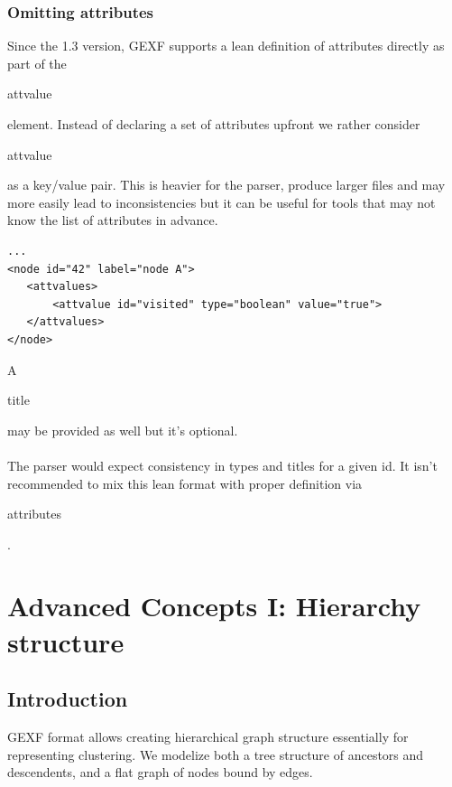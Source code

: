 \documentclass[a4paper,10pt]{article}
\begin{document}
\subsubsection{Omitting attributes}

Since the 1.3 version, GEXF supports a lean definition of attributes directly as part of the \begin{footnotesize}attvalue\end{footnotesize} element. Instead of declaring a set of attributes upfront we rather consider \begin{footnotesize}attvalue\end{footnotesize} as a key/value pair. This is heavier for the parser, produce larger files and may more easily lead to inconsistencies but it can be useful for tools that may not know the list of attributes in advance.

\lstset{ style=gexf }
\begin{lstlisting}[caption={Attribute definition in attvalue },label=attvalueidtype]
...
<node id="42" label="node A">
   <attvalues>
       <attvalue id="visited" type="boolean" value="true">
   </attvalues>
</node>
\end{lstlisting}

A \begin{footnotesize}title\end{footnotesize} may be provided as well but it's optional.

\paragraph{}
The parser would expect consistency in types and titles for a given id. It isn't recommended to mix this lean format with proper definition via \begin{footnotesize}attributes\end{footnotesize} .

\section{Advanced Concepts I: Hierarchy structure} \label{hierarchy}

\subsection{Introduction}

GEXF format allows creating hierarchical graph structure essentially for representing clustering. We modelize both a tree structure of ancestors and descendents, and a flat graph of nodes bound by edges.
\end{document}
